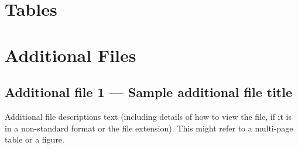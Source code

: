 \documentclass{bmcart}
\begin{document}
\begin{backmatter}

\section*{Tables}


\section*{Additional Files}
  \subsection*{Additional file 1 --- Sample additional file title}
    Additional file descriptions text (including details of how to
    view the file, if it is in a non-standard format or the file extension).  This might
    refer to a multi-page table or a figure.


\end{backmatter}
\end{document}
